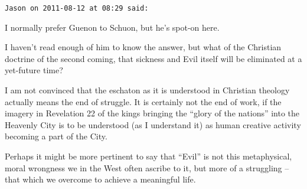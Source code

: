 \begin{footnotesize}
\begin{sffamily}
\texttt{Jason on 2011-08-12 at 08:29 said:}

I normally prefer Guenon to Schuon, but he's spot-on here.

I haven't read enough of him to know the answer, but what of the Christian doctrine of the second coming, that sickness and Evil itself will be eliminated at a yet-future time?

I am not convinced that the eschaton as it is understood in Christian theology actually means the end of struggle. It is certainly not the end of work, if the imagery in Revelation 22 of the kings bringing the ``glory of the nations'' into the Heavenly City is to be understood (as I understand it) as human creative activity becoming a part of the City.

Perhaps it might be more pertinent to say that ``Evil'' is not this metaphysical, moral wrongness we in the West often ascribe to it, but more of a struggling -- that which we overcome to achieve a meaningful life.

\hfill

\end{sffamily}
\end{footnotesize}

